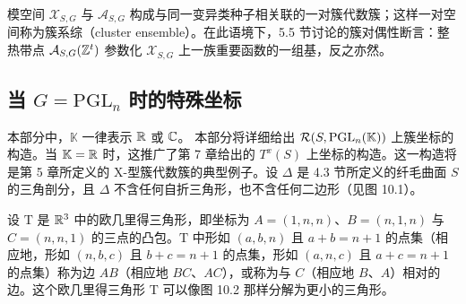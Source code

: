 \begin{remark}[10.22] 模空间 $\mathcal{X}_{S,G}$ 与 $\mathcal{A}_{S,G}$ 构成与同一变异类种子相关联的一对簇代数簇；这样一对空间称为簇系综（cluster ensemble）。在此语境下，5.5 节讨论的簇对偶性断言：整热带点 $\mathcal{A}_{S,G}(\mathbb{Z}^t)$ 参数化 $\mathcal{X}_{S,G}$ 上一族重要函数的一组基，反之亦然。
\end{remark}

\subsection{当 $G=\mathrm{PGL}_n$ 时的特殊坐标}

本部分中，$\mathbb{K}$ 一律表示 $\mathbb{R}$ 或 $\mathbb{C}$。
本部分将详细给出 $\mathcal{R}(S,\operatorname{PGL}_n(\mathbb{K}))$ 上簇坐标的构造。当 $\mathbb{K}=\mathbb{R}$ 时，这推广了第 7 章给出的 $T^x(S)$ 上坐标的构造。这一构造将是第 5 章所定义的 X-型簇代数簇的典型例子。设 $\Delta$ 是 4.3 节所定义的纤毛曲面 $S$ 的三角剖分，且 $\Delta$ 不含任何自折三角形，也不含任何二边形（见图 10.1）。


设 $\mathrm{T}$ 是 $\mathbb{R}^3$ 中的欧几里得三角形，即坐标为 $A=(1,n,n)$、$B=(n,1,n)$ 与 $C=(n,n,1)$ 的三点的凸包。$\mathrm{T}$ 中形如 $(a,b,n)$ 且 $a+b=n+1$ 的点集（相应地，形如 $(n,b,c)$ 且 $b+c=n+1$ 的点集，形如 $(a,n,c)$ 且 $a+c=n+1$ 的点集）称为边 $AB$（相应地 $BC$、$AC$），或称为与 $C$（相应地 $B$、$A$）相对的边。这个欧几里得三角形 $\mathrm{T}$ 可以像图 10.2 那样分解为更小的三角形。



